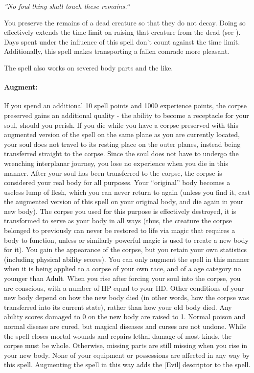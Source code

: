 \emph{''No foul thing shall touch these remains.``}

You preserve the remains of a dead creature so that they do not decay. 
Doing so effectively extends the time limit on raising that creature from the dead (see ). 
Days spent under the influence of this spell don't count against the time limit. 
Additionally, this spell makes transporting a fallen comrade more pleasant.

The spell also works on severed body parts and the like.

\paragraph{Augment:} If you spend an additional 10 spell points and 1000 experience points, 
the corpse preserved gains an additional quality - the ability to become a receptacle for your soul,
should you perish.
If you die while you have a corpse preserved with this augmented version of the spell
on the same plane as you are currently located, your soul does not travel to its resting place on the outer planes, 
instead being transferred straight to the corpse. Since the soul does not have to undergo the wrenching
interplanar journey, you lose no experience when you die in this manner.
After your soul has been transferred to the corpse, the corpse is considered your real body for all purposes.
Your ``original'' body becomes a useless lump of flesh, which you can never return to again (unless you find it, 
cast the augmented version of this spell on your original body, and die again in your new body).
The corpse you used for this purpose is effectively destroyed, it is transformed to serve as your body in all ways
(thus, the creature the corpse belonged to previously can never be restored to life via magic that requires a body
to function, unless  or similarly powerful magic is used to create a new body for it).
You gain the appearance of the corpse, but you retain your own statistics (including physical ability scores).
You can only augment the spell in this manner when it is being applied to a corpse of your own race, and of a age
category no younger than Adult.
When you rise after forcing your soul into the corpse, you are conscious, with a number of HP equal to your HD.
Other conditions of your new body depend on how the new body died (in other words, how the corpse was transferred into its
current state), rather than how your old body died.
Any ability scores damaged to 0 on the new body are raised to 1. 
Normal poison and normal disease are cured, but magical diseases and curses are not undone. 
While the spell closes mortal wounds and repairs lethal damage of most kinds, the corpse must be whole. 
Otherwise, missing parts are still missing when you rise in your new body. 
None of your equipment or possessions are affected in any way by this spell.
Augmenting the spell in this way adds the [Evil] descriptor to the spell.


